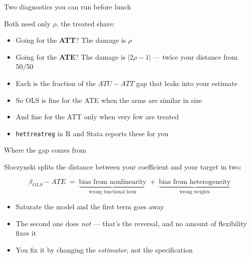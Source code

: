 \documentclass{beamer}
\begin{document}
\begin{frame}{Two diagnostics you can run before lunch}

Both need only $\rho$, the treated share:

\begin{itemize}
\item Going for the \textbf{ATT}? The damage is $\rho$
\item Going for the \textbf{ATE}? The damage is $|2\rho - 1|$ --- twice your distance from 50/50
\end{itemize}

\vspace{0.7em}

\begin{itemize}
\item Each is the fraction of the $ATU - ATT$ gap that leaks into your estimate
\item So OLS is fine for the ATE when the arms are similar in size
\item And fine for the ATT only when very few are treated
\item \texttt{hettreatreg} in R and Stata reports these for you
\end{itemize}

\end{frame}


\begin{frame}{Where the gap comes from}

Sloczynski splits the distance between your coefficient and your target in two:

$$\beta_{OLS} - ATE \;=\; \underbrace{\text{bias from nonlinearity}}_{\text{wrong functional form}}
  \;+\; \underbrace{\text{bias from heterogeneity}}_{\text{wrong weights}}$$

\vspace{0.6em}

\begin{itemize}
\item Saturate the model and the first term goes away
\item The second one does \emph{not} --- that's the reversal, and no amount of flexibility fixes it
\item You fix it by changing the \emph{estimator}, not the specification
\end{itemize}

\end{frame}
\end{document}
